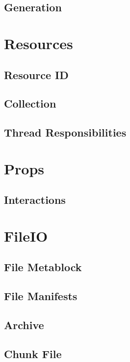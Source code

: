 \documentclass{report}
\begin{document}
\section{Generation}


\chapter{Resources}

\section{Resource ID}

\section{Collection}

\section{Thread Responsibilities}


\chapter{Props}

\section{Interactions}


\chapter{FileIO}

\section{File Metablock}

\section{File Manifests}

\section{Archive}

\section{Chunk File}

\end{document}
